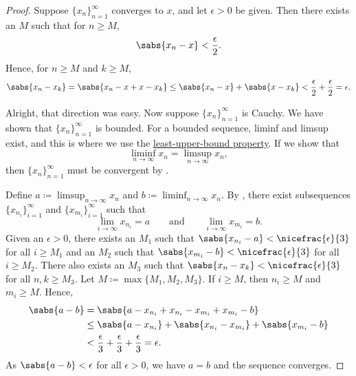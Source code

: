 \begin{proof}
Suppose $\{ x_n \}_{n=1}^\infty$ converges to $x$,
and
let $\epsilon > 0$ be given.
Then there 
exists an $M$ such that for $n \geq M$,
\begin{equation*}
\sabs{x_n - x} < \frac{\epsilon}{2} .
\end{equation*}
Hence, for $n \geq M$ and $k \geq M$,
\begin{equation*}
\sabs{x_n - x_k} = 
\sabs{x_n - x + x - x_k}
\leq \sabs{x_n-x} + \sabs{x-x_k} < \frac{\epsilon}{2} + \frac{\epsilon}{2} =
\epsilon .
\end{equation*}

Alright, that direction was easy.  Now suppose $\{ x_n \}_{n=1}^\infty$ is Cauchy.
We have shown that $\{ x_n \}_{n=1}^\infty$ is bounded.
For a bounded sequence, liminf and limsup exist, and this is
where we use the
\hyperref[defn:lub]{least-upper-bound property}.
If we show that
\begin{equation*}
\liminf_{n\to \infty} x_n = \limsup_{n\to\infty} x_n ,
\end{equation*}
then $\{ x_n \}_{n=1}^\infty$ must be convergent by .


Define $a \coloneqq \limsup_{n\to\infty} x_n$ and
$b \coloneqq \liminf_{n\to\infty} x_n$.
By , there exist subsequences
$\{ x_{n_i} \}_{i=1}^\infty$ and
$\{ x_{m_i} \}_{i=1}^\infty$ such that
\begin{equation*}
\lim_{i\to\infty} x_{n_i} = a
\qquad \text{and} \qquad
\lim_{i\to\infty} x_{m_i} = b.
\end{equation*}
Given an $\epsilon > 0$,
there exists an $M_1$ such that
$\sabs{x_{n_i} - a} < \nicefrac{\epsilon}{3}$ for all $i \geq M_1$
and an $M_2$ such that
$\sabs{x_{m_i} - b} < \nicefrac{\epsilon}{3}$ for all $i \geq M_2$.
There also exists an $M_3$
such that
$\sabs{x_n-x_k} < \nicefrac{\epsilon}{3}$
for all $n,k \geq M_3$.
Let $M \coloneqq \max \{ M_1, M_2, M_3 \}$.
If $i \geq M$, then $n_i \geq M$ and $m_i \geq M$.  Hence,
\begin{equation*}
\begin{split}
\sabs{a-b} & =
\sabs{a-x_{n_i}+x_{n_i}
-x_{m_i}+x_{m_i}
-b} \\
& \leq
\sabs{a-x_{n_i}}
+ \sabs{x_{n_i} -x_{m_i}}
+ \sabs{x_{m_i} -b} \\
& <
\frac{\epsilon}{3}
+
\frac{\epsilon}{3}
+
\frac{\epsilon}{3}
= \epsilon .
\end{split}
\end{equation*}
As $\sabs{a-b} < \epsilon$ for all $\epsilon > 0$, we have $a=b$ and 
the sequence converges.
\end{proof}



